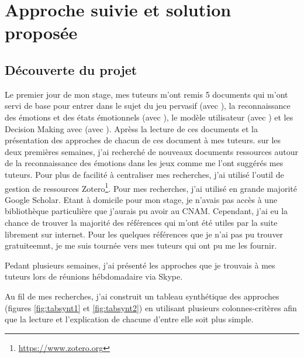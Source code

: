 \documentclass{article}
\begin{document}
\section{Approche suivie et solution proposée}
	\subsection{Découverte du projet}
		Le premier jour de mon stage, mes tuteurs m'ont remis 5 documents qui m'ont servi de base pour entrer dans le sujet du jeu pervasif (avec \cite{gal_2019}), la reconnaissance des émotions et des états émotionnels (avec \cite{gal_2019,gizycka_et_al._2018,nalepa_et_al._2019}), le modèle utilisateur (avec \cite{alhudar_2019}) et les Decision Making avec (avec \cite{kornyshova_et_al._2010}).\newline
		Aprèss la lecture de ces documents et la présentation des approches de chacun de ces document à mes tuteurs. sur les deux premières semaines, j'ai recherché de nouveaux documents ressources autour de la reconnaissance des émotions dans les jeux comme me l'ont suggérés mes tuteurs. 
		Pour plus de facilité à centraliser mes recherches, j'ai utilisé l'outil de gestion de ressources Zotero\footnote{\href{https://www.zotero.org}{https://www.zotero.org}}. 
		Pour mes recherches, j'ai utilisé en grande majorité Google Scholar. 
		Etant à domicile pour mon stage, je n'avais pas accès à une bibliothèque particulière que j'aurais pu avoir au CNAM. 
		Cependant, j'ai eu la chance de trouver la majorité des références qui m'ont été utiles par la suite librement sur internet. 
		Pour les quelques références que je n'ai pas pu trouver gratuiteemnt, je me suis tournée vers mes tuteurs qui ont pu me les fournir.\par
		Pedant plusieurs semaines, j'ai présenté les approches que je trouvais à mes tuteurs lors de réunions hébdomadaire via Skype.\par
		Au fil de mes recherches, j'ai construit un tableau synthétique des approches (figures \ref{fig:tabsynt1} et \ref{fig:tabsynt2}) en utilisant plusieurs colonnes-critères afin que la lecture et l'explication de chacune d'entre elle soit plus simple.\par
\end{document}
